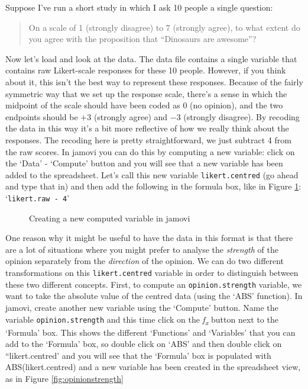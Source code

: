 Suppose I've run a short study in which I ask 10 people a single question: 
\begin{quote}
On a scale of 1 (strongly disagree) to 7 (strongly agree), to what extent do you agree with the proposition that ``Dinosaurs are awesome''?
\end{quote}
Now let's load and look at the data. The data file  contains a single variable that contains raw Likert-scale responses for these 10 people. However, if you think about it, this isn't the best way to represent these responses. Because of the fairly symmetric way that we set up the response scale, there's a sense in which the midpoint of the scale should have been coded as 0 (no opinion), and the two endpoints should be $+3$ (strongly agree) and $-3$ (strongly disagree). By recoding the data in this way it's a bit more reflective of how we really think about the responses. The recoding here is pretty straightforward, we just subtract 4 from the raw scores. In jamovi you can do this by computing a new variable: click on the `Data' - `Compute' button and you will see that a new variable has been added to the spreadsheet. Let's call this new variable \texttt{likert.centred} (go ahead and type that in) and then add the following in the formula box, like in Figure \ref{fig:likertraw}: `\texttt{likert.raw - 4}' 

\vspace{0.5cm}
\begin{figure}[htb]
\begin{center}
\caption{Creating a new computed variable in jamovi}
\label{fig:likertraw}
\end{center}
\end{figure}
\newpage

One reason why it might be useful to have the data in this format is that there are a lot of situations where you might prefer to analyse the {\it strength} of the opinion separately from the {\it direction} of the opinion. We can do two different transformations on this \texttt{likert.centred} variable in order to distinguish between these two different concepts. First, to compute an \texttt{opinion.strength} variable, we want to take the absolute value of the centred data (using the `ABS' function). In jamovi, create another new variable using the `Compute' button. Name the variable \texttt{opinion.strength} and this time click on the {\it f\textsubscript{x}} button next to the `Formula' box. This shows the different `Functions' and `Variables' that you can add to the `Formula' box, so double click on `ABS' and then double click on ``likert.centred' and you will see that the `Formula' box is populated with ABS(likert.centred) and a new variable has been created in the spreadsheet view, as in Figure \ref{fig:opinionstrength}

